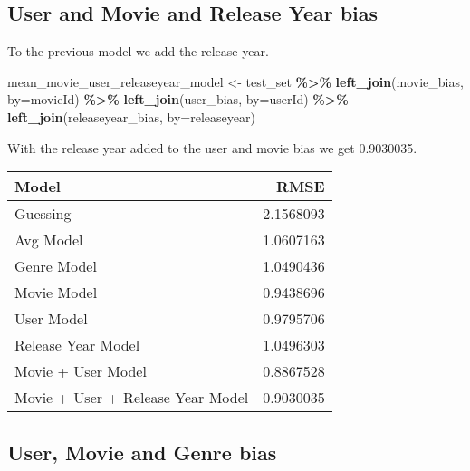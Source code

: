 \documentclass[
]{article}
\newenvironment{Shaded}{\begin{snugshade}}{\end{snugshade}}
\newcommand{\AttributeTok}[1]{\textcolor[rgb]{0.13,0.29,0.53}{#1}}
\newcommand{\FunctionTok}[1]{\textcolor[rgb]{0.13,0.29,0.53}{\textbf{#1}}}
\newcommand{\NormalTok}[1]{#1}
\newcommand{\OtherTok}[1]{\textcolor[rgb]{0.56,0.35,0.01}{#1}}
\newcommand{\SpecialCharTok}[1]{\textcolor[rgb]{0.81,0.36,0.00}{\textbf{#1}}}
\newcommand{\StringTok}[1]{\textcolor[rgb]{0.31,0.60,0.02}{#1}}
\begin{document}
\hypertarget{user-and-movie-and-release-year-bias}{%
\subsection{User and Movie and Release Year
bias}\label{user-and-movie-and-release-year-bias}}

To the previous model we add the release year.

\begin{Shaded}
\begin{Highlighting}[]
\NormalTok{mean\_movie\_user\_releaseyear\_model }\OtherTok{\textless{}{-}}\NormalTok{ test\_set }\SpecialCharTok{\%\textgreater{}\%}
  \FunctionTok{left\_join}\NormalTok{(movie\_bias, }\AttributeTok{by=}\StringTok{\textquotesingle{}movieId\textquotesingle{}}\NormalTok{) }\SpecialCharTok{\%\textgreater{}\%}
  \FunctionTok{left\_join}\NormalTok{(user\_bias, }\AttributeTok{by=}\StringTok{\textquotesingle{}userId\textquotesingle{}}\NormalTok{) }\SpecialCharTok{\%\textgreater{}\%}
  \FunctionTok{left\_join}\NormalTok{(releaseyear\_bias, }\AttributeTok{by=}\StringTok{\textquotesingle{}releaseyear\textquotesingle{}}\NormalTok{)}
\end{Highlighting}
\end{Shaded}

With the release year added to the user and movie bias we get 0.9030035.

\begin{tabular}{l|r}
\hline
Model & RMSE\\
\hline
Guessing & 2.1568093\\
\hline
Avg Model & 1.0607163\\
\hline
Genre Model & 1.0490436\\
\hline
Movie Model & 0.9438696\\
\hline
User Model & 0.9795706\\
\hline
Release Year Model & 1.0496303\\
\hline
Movie + User Model & 0.8867528\\
\hline
Movie + User + Release Year Model & 0.9030035\\
\hline
\end{tabular}

\hypertarget{user-movie-and-genre-bias}{%
\subsection{User, Movie and Genre
bias}\label{user-movie-and-genre-bias}}
\end{document}
